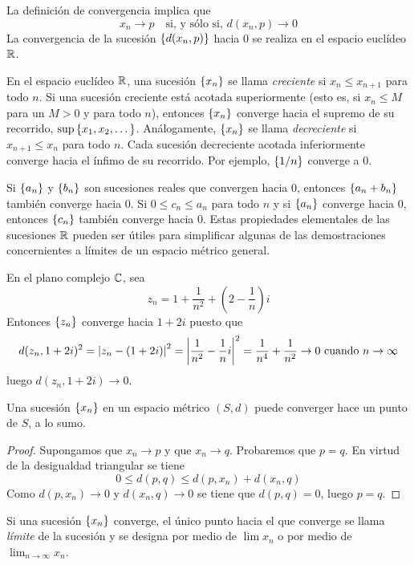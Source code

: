 La definición de convergencia implica que
$$x_n\to p\quad\text{si, y sólo si, }d(x_n, p)\to 0$$
La convergencia de la sucesión $\left\lbrace d(x_n, p)\right\rbrace$ hacia $0$ se realiza en el espacio euclídeo $\mathbb{R}$.

\begin{example}
    En el espacio euclídeo $\mathbb{R}$, una sucesión $\left\lbrace x_n\right\rbrace$ se llama {\it creciente} si $x_n\leq x_{n+1}$ para todo $n$. Si una sucesión creciente está acotada superiormente (esto es, si $x_n\leq M$ para un $M>0$ y para todo $n$), entonces $\left\lbrace x_n\right\rbrace$ converge hacia el supremo de su recorrido, $\sup\left\lbrace x_1,x_2,\dots\right\rbrace$. Análogamente, $\left\lbrace x_n\right\rbrace$ se llama {\it decreciente} si $x_{n+1}\leq x_n$ para todo $n$. Cada sucesión decreciente acotada inferiormente converge hacia el ínfimo de su recorrido. Por ejemplo, $\left\lbrace1/n\right\rbrace$ converge a $0$.
\end{example}

\begin{example}
    Si $\left\lbrace a_n\right\rbrace$ y $\left\lbrace b_n\right\rbrace$ son sucesiones reales que convergen hacia $0$, entonces $\left\lbrace a_n+b_n\right\rbrace$ también converge hacia $0$. Si $0\leq c_n\leq a_n$ para todo $n$ y si $\left\lbrace a_n\right\rbrace$ converge hacia $0$, entonces $\left\lbrace c_n\right\rbrace$ también converge hacia $0$. Estas propiedades elementales de las sucesiones $\mathbb{R}$ pueden ser útiles para simplificar algunas de las demostraciones concernientes a límites de un espacio métrico general.
\end{example}

\begin{example}
    En el plano complejo $\mathbb{C}$, sea
    $$z_n=1+\frac{1}{n^2}+\left(2-\frac{1}{n}\right)i$$
    Entonces $\left\lbrace z_n\right\rbrace$ converge hacia $1+2i$ puesto que
    $$d(z_n, 1+2i)^2=\left| z_n - (1+2i)\right|^2=\left| \frac{1}{n^2}-\frac{1}{n}i\right|^2=\frac{1}{n^4}+\frac{1}{n^2}\to 0\text{ cuando }n\to\infty$$
    luego $d(z_n, 1+2i)\to 0$.
\end{example}

\begin{theorem}
    Una sucesión $\left\lbrace x_n\right\rbrace$ en un espacio métrico $(S,d)$ puede converger hace un punto de $S$, a lo sumo.
\end{theorem}

\begin{proof}
    Supongamos que $x_n\to p$ y que $x_n\to q$. Probaremos que $p=q$. En virtud de la desigualdad triangular se tiene
    $$0\leq d(p,q)\leq d(p,x_n)+d(x_n,q)$$
    Como $d(p,x_n)\to 0$ y $d(x_n,q)\to 0$ se tiene que $d(p,q)=0$, luego $p=q$.
\end{proof}

Si una sucesión $\left\lbrace x_n\right\rbrace$ converge, el único punto  hacia el que converge se llama {\it límite} de la sucesión y se designa por medio de $\lim x_n$ o por medio de $\lim_{n\to\infty}x_n$.
